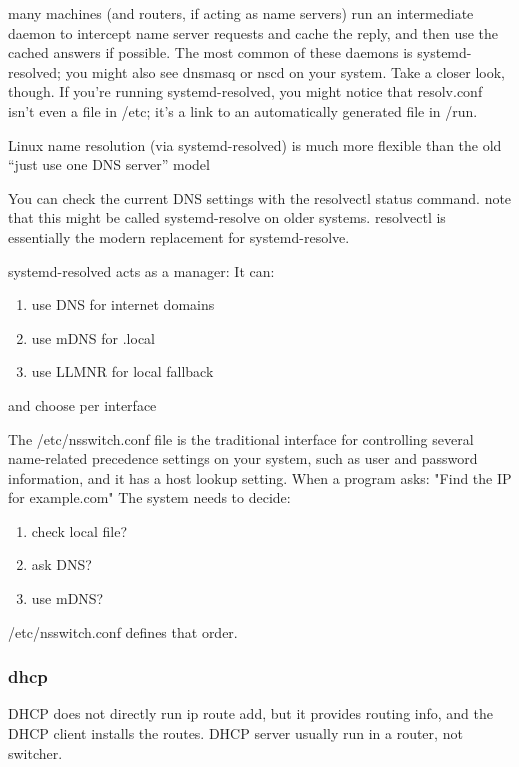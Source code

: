 \documentclass[paper=8.5in:11in, twoside, 12pt, pagesize=pdftex]{book}
\begin{document}
\par many machines (and routers, if acting as name servers) run an intermediate daemon to intercept name server requests and cache the reply, and then use the cached answers if possible. The most common of these daemons is systemd-resolved; you might also see dnsmasq or nscd on your system. Take a closer
look, though. If you’re running systemd-resolved, you might notice that resolv.conf isn’t even a file in /etc; it’s a link to an automatically generated file in /run. 

\par Linux name resolution (via systemd-resolved) is much more flexible than the old “just use one DNS server” model

\par You can check the current DNS settings with the resolvectl status command. note that this might be called systemd-resolve on older systems. resolvectl is essentially the modern replacement for systemd-resolve.

\par systemd-resolved acts as a manager: It can:
\begin{enumerate}
\item use DNS for internet domains 
\item use mDNS for .local
\item use LLMNR for local fallback
\end{enumerate}
and choose per interface


\par The /etc/nsswitch.conf file is the traditional interface for controlling several name-related precedence settings on your system, such as user and password information, and it has a host lookup setting. When a program asks: "Find the IP for example.com" The system needs to decide:

\begin{enumerate}
\item check local file?
\item ask DNS?
\item use mDNS? 
\end{enumerate}
/etc/nsswitch.conf defines that order.


\subsubsection{dhcp}

	\par DHCP does not directly run ip route add, but it provides routing info, and the DHCP client installs the routes. DHCP server usually run in a router, not switcher.
\end{document}
